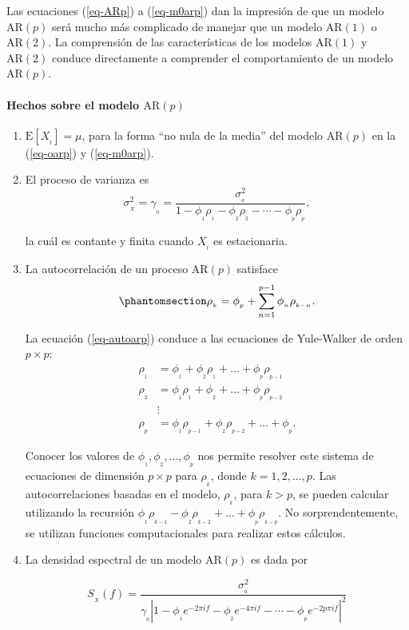 \documentclass[
  us-letterpaper,
]{scrreprt}
\let\oldparagraph\paragraph
\renewcommand{\paragraph}[1]{\oldparagraph{#1}\mbox{}}
\theoremstyle{plain}
\theoremstyle{definition}
\theoremstyle{definition}
\theoremstyle{plain}
\theoremstyle{remark}
\begin{document}
Las ecuaciones (\ref{eq-ARp}) a (\ref{eq-m0arp}) dan la impresión de que
un modelo \(\mathrm{AR}(p)\) será mucho más complicado de manejar que un
modelo \(\mathrm{AR}(1)\) o \(\mathrm{AR}(2)\). La comprensión de las
características de los modelos \(\mathrm{AR}(1)\) y \(\mathrm{AR}(2)\)
conduce directamente a comprender el comportamiento de un modelo
\(\mathrm{AR}(p)\).

\paragraph{\texorpdfstring{Hechos sobre el modelo
\(\mathrm{AR}(p)\)}{Hechos sobre el modelo \textbackslash mathrm\{AR\}(p)}}\label{hechos-sobre-el-modelo-mathrmarp}

\begin{enumerate}
\def\labelenumi{\roman{enumi}.}
\item
  \(\mathrm{E}[X_{_t}]=\mu\), para la forma ``no nula de la media'' del
  modelo \(\mathrm{AR}(p)\) en la (\ref{eq-oarp}) y (\ref{eq-m0arp}).
\item
  El proceso de varianza es
  \[\sigma_{_X}^2=\gamma_{_0}=\frac{\sigma_{_a}^2}{1-\phi_{_1}\rho_{_1}-\phi_{_2}\rho_{_2}-\cdots-\phi_{_p}\rho_{_p}},\]

  la cuál es contante y finita cuando \(X_{_t}\) es estacionaria.
\item
  La autocorrelación de un proceso \(\mathrm{AR}(p)\) satisface
  \begin{equation}\phantomsection\label{eq-autoarp}{
  \rho_{_k}=\phi_{_p}+\sum_{n=1}^{p-1}\phi_{_n}\rho_{_{k-n}}.
  }\end{equation}

  La ecuación (\ref{eq-autoarp}) conduce a las ecuaciones de Yule-Walker
  de orden \(p\times p\): \[
      \begin{split}
  \rho_{_{1}} &= \phi_{_1}+\phi_{_{2}} \rho_{_1} +\ldots + \phi_{_p} \rho_{_{p-1}} \\
  \rho_{_{2}} &= \phi_{_1}\rho_{_1}+\phi_{_{2}}  +\ldots + \phi_{_p} \rho_{_{p-2}}\\
  &\vdots \\
  \rho_{_{p}} &= \phi_{_1}\rho_{_{p-1}}+\phi_{_{2}} \rho_{_{p-2}} +\ldots + \phi_{_p}.
  \end{split}
    \]

  Conocer los valores de \(\phi_{_1}, \phi_{_2}, \ldots, \phi_{_p}\) nos
  permite resolver este sistema de ecuaciones de dimensión \(p\times p\)
  para \(\rho_{_k}\), donde \(k = 1, 2, \ldots, p\). Las
  autocorrelaciones basadas en el modelo, \(\rho_{_k}\), para \(k > p\),
  se pueden calcular utilizando la recursión
  \(\phi_{_1} \rho_{_{k-1}} - \phi_{_2} \rho_{_{k-2}} + \ldots + \phi_{_p} \rho_{_{k-p}}\).
  No sorprendentemente, se utilizan funciones computacionales para
  realizar estos cálculos.
\item
  La densidad espectral de un modelo \(\mathrm{AR}(p)\) es dada por

  \[
  S_{_X}(f)=\frac{\sigma_{_a}^2}{\gamma_{_0}|1-\phi_{_1}e^{-2\pi i f}-\phi_{_2}e^{-4\pi i f}-\cdots-\phi_{_p}e^{-2p\pi i f}|^2}
  \]
\end{enumerate}
\end{document}
